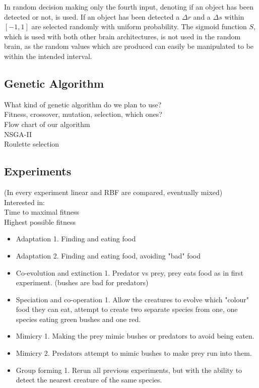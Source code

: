 \documentclass[a4paper,11pt]{kth-mag}
\begin{document}
In random decision making only the fourth input, denoting if an object has been detected or not, is used. If an object has been detected a $\Delta r$ and a $\Delta s$ within $[-1,1]$ are selected randomly with uniform probability.  The sigmoid function $S$, which is used with both other brain architectures, is not used in the random brain, as the random values which are produced can easily be manipulated to be within the intended interval. 

\subsection{Genetic Algorithm}
What kind of genetic algorithm do we plan to use?\\
Fitness, crossover, mutation, selection, which ones?\\
Flow chart of our algorithm\\
NSGA-II\\
Roulette selection\\

\subsection{Experiments}
(In every experiment linear and RBF are compared, eventually mixed)\\
Interested in:\\
Time to maximal fitness\\
Highest possible fitness\\
\begin{itemize}
\item Adaptation 1. Finding and eating food
\item Adaptation 2. Finding and eating food, avoiding "bad" food
\item Co-evolution and extinction 1. Predator vs prey, prey eats food as in first experiment. (bushes are bad for predators)
\item Speciation and co-operation 1. Allow the creatures to evolve which "colour" food they can eat, attempt to create two separate species from one, one species eating green bushes and one red.
\item Mimicry 1. Making the prey mimic bushes or predators to avoid being eaten.
\item Mimicry 2. Predators attempt to mimic bushes to make prey run into them.
\item Group forming 1. Rerun all previous experiments, but with the ability to detect the nearest creature of the same species.
\end{itemize}
\end{document}
